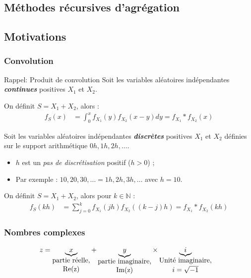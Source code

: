 \documentclass[10pt, french]{article}
\begin{document}
\begin{multicols*}{2}



\pagebreak
\section{Méthodes récursives d'agrégation}
\subsection{Motivations}
\subsubsection{Convolution}
\begin{rappel}{Rappel: Produit de convolution}
Soit les variables aléatoires indépendantes \textbf{\textit{continues}} positives $X_{1}$ et $X_{2}$.

\bigskip

On définit $S	=	X_{1} + X_{2}$, alors :
\begin{align*}
	f_{S}(x)
	&=	\int_{0}^{x} f_{X_{1}}(y) f_{X_{2}}(x - y) dy
	=	f_{X_{1}} \ast f_{X_{2}}(x)
\end{align*}

\tcbline

Soit les variables aléatoires indépendantes \textbf{\textit{discrètes}} positives $X_{1}$ et $X_{2}$ définies sur le support arithmétique $0h, 1h, 2h, \dots$.
\begin{itemize}
	\item	$h$ est un \og \textit{pas de discrétisation} \fg{} positif ($h > 0$) ;
	\item	Par exemple : $10, 20, 30, \ldots  = 1h, 2h, 3h, \dots$ avec $h = 10$.
\end{itemize}

On définit $S	=	X_{1} + X_{2}$, alors pour $k \in \mathbb{N}$ :
\begin{align*}
	f_{S}(kh)
	&=	\sum_{j = 0}^{k} f_{X_{1}}(jh) f_{X_{2}}((k - j)h) 
	=	f_{X_{1}} \ast f_{X_{2}}(kh)
\end{align*}
\end{rappel}



\subsubsection{Nombres complexes}
\begin{align*}
	z	&=	\underbrace{x}_{\shortstack{partie réelle,\\ \text{Re}(z)}} + \underbrace{y}_{\shortstack{partie imaginaire,\\ \text{Im}(z)}}\times\underbrace{i}_{\shortstack{Unité imaginaire,\\ $i = \sqrt{-1}$}}
\end{align*}


\end{multicols*}
\end{document}
